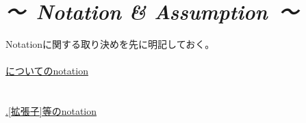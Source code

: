 \documentclass[10pt,a4j,openany,dvipdfmx]{jsbook}
\begin{document}
\chapter*{\it {～\ Notation }\rm{\&}\it{ Assumption\ ～}}
Notationに関する取り決めを先に明記しておく。
\\
\\
\underline{についてのnotation}\\
\\
\\
\underline{.[拡張子]等のnotation}\\


\end{document}
